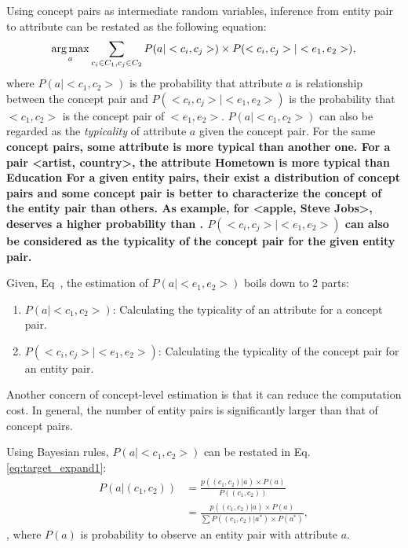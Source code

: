 Using concept pairs as intermediate random variables, inference from entity pair to attribute can be restated as the following equation:
\begin{equation}
\label{eq:target}
\operatorname*{arg\,max}_a \sum_{c_i\in C_1 , c_j \in C_2 }P(a|<c_{i},c_{j}>)\times P(<c_{i},c_{j}>|<e_{1},e_{2}>),
\end{equation}
where $P(a|<c_{1},c_{2}>)$ is the probability that attribute $a$ is relationship between the concept pair
and $P(<c_{i},c_{j}>|<e_{1},e_{2}>)$ is the probability that $<c_1, c_2>$ is the concept pair of $<e_1, e_2>$.
$P(a|<c_{1},c_{2}>)$ can also be regarded as the {\it typicality} of attribute $a$ given the concept pair.
For the same \bf{concept} pairs, some attribute is more typical than another one.
For a pair \ac{<artist, country>}, the attribute \ac{Hometown} is more typical than \ac{Education}
For a given entity pairs, their exist a distribution of concept pairs and some concept pair is better to characterize the concept of the entity pair than others.
As example,  for \ac{<apple, Steve Jobs>},   deserves a higher probability than .
$P(<c_{i},c_{j}>|<e_{1},e_{2}>)$ can also be considered as the typicality of the concept pair for the given entity pair.

Given, Eq~\label{eq:target}, the estimation of $P(a|<e_1,e_2>)$ boils down to 2 parts:
\begin{enumerate}
\item $P(a|<c_{1},c_{2}>)$: Calculating the typicality of an attribute for a concept pair.
\item $P(<c_{i},c_{j}>|<e_{1},e_{2}>)$: Calculating the typicality of the concept pair for an entity pair.
\end{enumerate}

Another concern of concept-level estimation is that it can reduce the computation cost.
In general, the number of entity pairs is significantly larger than that of concept pairs.

Using Bayesian rules, $P(a|<c_{1},c_{2}>)$ can be restated in Eq.\ref{eq:target_expand1}:
\begin{equation}
\label{eq:target_expand1}
\begin{split}
P(a|(c_{1},c_{2})) &= \frac{ p((c_{1},c_{2})|a)\times P(a) }{ P( (c_{1},c_{2}) ) }\\
&=\frac{ p((c_{1},c_{2})|a)\times P(a) }{ \sum{P( (c_{1},c_{2})|a^* )\times P(a^*)   } },
\end{split}
\end{equation},
where $P(a)$ is probability to observe an entity pair with attribute $a$.

